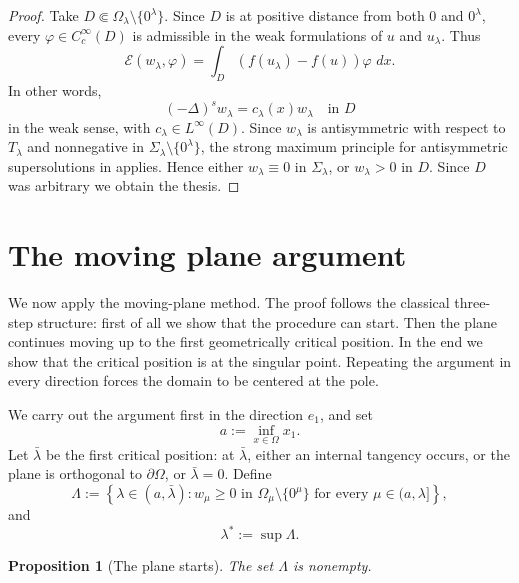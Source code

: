 \documentclass[11pt,a4paper]{article}
\newtheorem{proposition}[theorem]{Proposition}
\newcommand{\dd}{\,d}
\begin{document}
\begin{proof}
Take \(D\Subset\Omega_\lambda\setminus\{0^\lambda\}\). Since \(D\) is at positive distance from both \(0\) and \(0^\lambda\), every \(\varphi\in C_c^\infty(D)\) is admissible in the weak formulations of \(u\) and \(u_\lambda\). Thus
\[
\mathcal E(w_\lambda,\varphi)
=
\int_D(f(u_\lambda)-f(u))\varphi\,\dd x.
\]
In other words,
\[
(-\Delta)^s w_\lambda=c_\lambda(x)w_\lambda
\quad\text{in }D
\]
in the weak sense, with \(c_\lambda\in L^\infty(D)\). Since \(w_\lambda\) is antisymmetric with respect to \(T_\lambda\) and nonnegative in $\Sigma_\lambda\setminus\{0^\lambda\}$, the strong maximum principle for antisymmetric supersolutions in \cite{FallJarohs} applies. Hence either \(w_\lambda\equiv0\) in \(\Sigma_\lambda\), or \(w_\lambda>0\) in \(D\). Since \(D\) was arbitrary we obtain the thesis.
\end{proof}


\section{The moving plane argument}
\label{moving plane}


We now apply the moving-plane method. The proof follows the classical three-step structure: first of all we show that the procedure can start. Then the plane continues moving up to the first geometrically critical position. In the end we show that the critical position is at the singular point. Repeating the argument in every direction forces the domain to be centered at the pole.

We carry out the argument first in the direction \(e_1\), and set
\[
a:=\inf_{x\in\Omega}x_1.
\]
Let \(\bar\lambda\) be the first critical position: at \(\bar\lambda\), either an internal tangency occurs, or the plane is orthogonal to \(\partial\Omega\), or \(\bar\lambda=0\). Define
\[
\Lambda
:=
\left\{
\lambda\in(a,\bar\lambda):
w_\mu\ge0
\text{ in }\Omega_\mu\setminus\{0^\mu\}
\text{ for every }\mu\in(a,\lambda]
\right\},
\]
and
\[
\lambda^*:=\sup\Lambda.
\]

\begin{proposition}[The plane starts]\label{prop:plane-starts}
The set \(\Lambda\) is nonempty.
\end{proposition}
\end{document}
